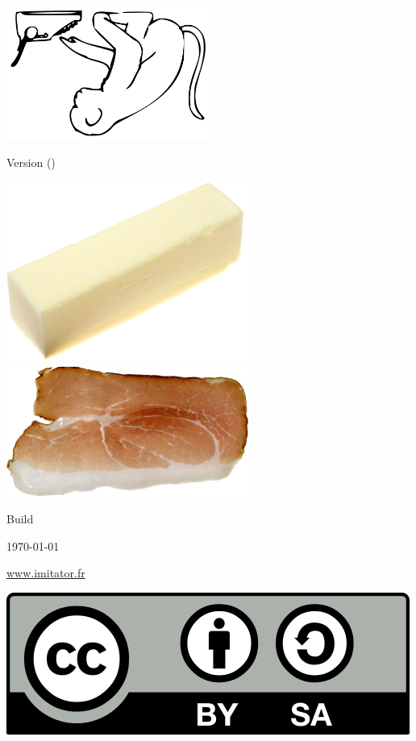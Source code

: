 
\thispagestyle{empty}

\mbox{}

\vspace{1cm}

\begin{center}
	{\Huge \bfseries \titleOnFirstPage{}}

	\vspace{2cm}

	\includegraphics[width=0.50\textwidth]{../logos/imitator-500.png}

	\vspace{2.5cm}
	
	{\Large Version \imitatorversion{} (\imitatorversionname{})}
	
	\medskip
	
	\includegraphics[height=0.15\textwidth]{../logos/logo2-300.png}
% 	
	\includegraphics[height=0.15\textwidth]{../logos/logo2-8-300.png}

\end{center}

\vspace{1.5cm}

{\small \hfill{}Build }

{\small \hfill{}\today{}}

\vspace{2cm}

\begin{center}
 	{\Large \url{www.imitator.fr}}
 	
\end{center}
\hfill\includegraphics[width=.15\textwidth]{images/CC-BY-SA_500.png}



